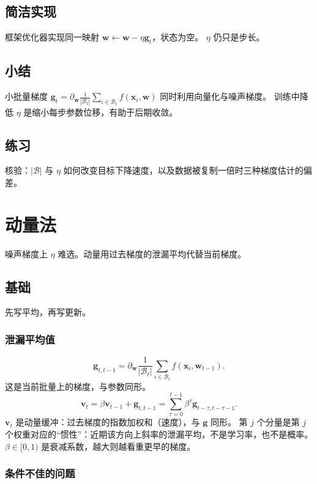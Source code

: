 \subsection{简洁实现}

框架优化器实现同一映射
$\bm{w}\leftarrow\bm{w}-\eta\bm{g}_t$，状态为空。
$\eta$ 仍只是步长。

\subsection{小结}

小批量梯度
$\bm{g}_t=\partial_{\bm{w}}\frac{1}{|\mathcal{B}_t|}\sum_{i\in\mathcal{B}_t}f(\bm{x}_i,\bm{w})$
同时利用向量化与噪声梯度。
训练中降低 $\eta$ 是缩小每步参数位移，有助于后期收敛。

\subsection{练习}

核验：$|\mathcal{B}|$ 与 $\eta$ 如何改变目标下降速度，以及数据被复制一倍时三种梯度估计的偏差。

\section{动量法}

噪声梯度上 $\eta$ 难选。动量用过去梯度的泄漏平均代替当前梯度。

\subsection{基础}

先写平均，再写更新。

\subsubsection{泄漏平均值}

\[
\bm{g}_{t,t-1}
=
\partial_{\bm{w}}
\frac{1}{|\mathcal{B}_t|}
\sum_{i\in\mathcal{B}_t}f(\bm{x}_i,\bm{w}_{t-1}).
\]
这是当前批量上的梯度，与参数同形。
\[
\bm{v}_t=\beta\bm{v}_{t-1}+\bm{g}_{t,t-1}
=
\sum_{\tau=0}^{t-1}\beta^{\tau}\bm{g}_{t-\tau,t-\tau-1}.
\]
$\bm{v}_t$ 是动量缓冲：过去梯度的指数加权和（速度），与 $\bm{g}$ 同形。
第 $j$ 个分量是第 $j$ 个权重对应的“惯性”：近期该方向上斜率的泄漏平均，不是学习率，也不是概率。
$\beta\in[0,1)$ 是衰减系数，越大则越看重更早的梯度。

\subsubsection{条件不佳的问题}

